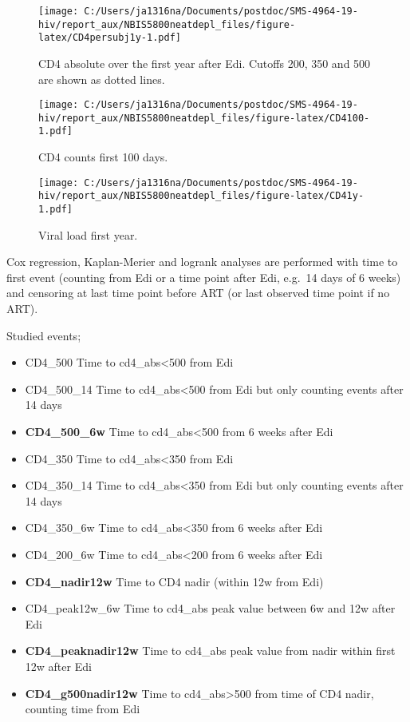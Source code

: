\documentclass[
]{article}
\begin{document}
\begin{figure}
\centering
\texttt{[image: C:/Users/ja1316na/Documents/postdoc/SMS-4964-19-hiv/report\_aux/NBIS5800neatdepl\_files/figure-latex/CD4persubj1y-1.pdf]}
\caption{\label{fig:CD4persubj1y}CD4 absolute over the first year after Edi. Cutoffs 200, 350 and 500 are shown as dotted lines.}
\end{figure}

\begin{figure}
\centering
\texttt{[image: C:/Users/ja1316na/Documents/postdoc/SMS-4964-19-hiv/report\_aux/NBIS5800neatdepl\_files/figure-latex/CD4100-1.pdf]}
\caption{\label{fig:CD4100}CD4 counts first 100 days.}
\end{figure}

\begin{figure}
\centering
\texttt{[image: C:/Users/ja1316na/Documents/postdoc/SMS-4964-19-hiv/report\_aux/NBIS5800neatdepl\_files/figure-latex/CD41y-1.pdf]}
\caption{\label{fig:CD41y}Viral load first year.}
\end{figure}

\FloatBarrier

Cox regression, Kaplan-Merier and logrank analyses are performed with time to first event (counting from Edi or a time point after Edi, e.g.~14 days of 6 weeks) and censoring at last time point before ART (or last observed time point if no ART).

Studied events;

\begin{itemize}
\item
  CD4\_500 Time to cd4\_abs\textless500 from Edi
\item
  CD4\_500\_14 Time to cd4\_abs\textless500 from Edi but only counting events after 14 days
\item
  \textbf{CD4\_500\_6w} Time to cd4\_abs\textless500 from 6 weeks after Edi
\item
  CD4\_350 Time to cd4\_abs\textless350 from Edi
\item
  CD4\_350\_14 Time to cd4\_abs\textless350 from Edi but only counting events after 14 days
\item
  CD4\_350\_6w Time to cd4\_abs\textless350 from 6 weeks after Edi
\item
  CD4\_200\_6w Time to cd4\_abs\textless200 from 6 weeks after Edi
\item
  \textbf{CD4\_nadir12w} Time to CD4 nadir (within 12w from Edi)
\item
  CD4\_peak12w\_6w Time to cd4\_abs peak value between 6w and 12w after Edi
\item
  \textbf{CD4\_peaknadir12w} Time to cd4\_abs peak value from nadir within first 12w after Edi
\item
  \textbf{CD4\_g500nadir12w} Time to cd4\_abs\textgreater500 from time of CD4 nadir, counting time from Edi
\end{itemize}
\end{document}
